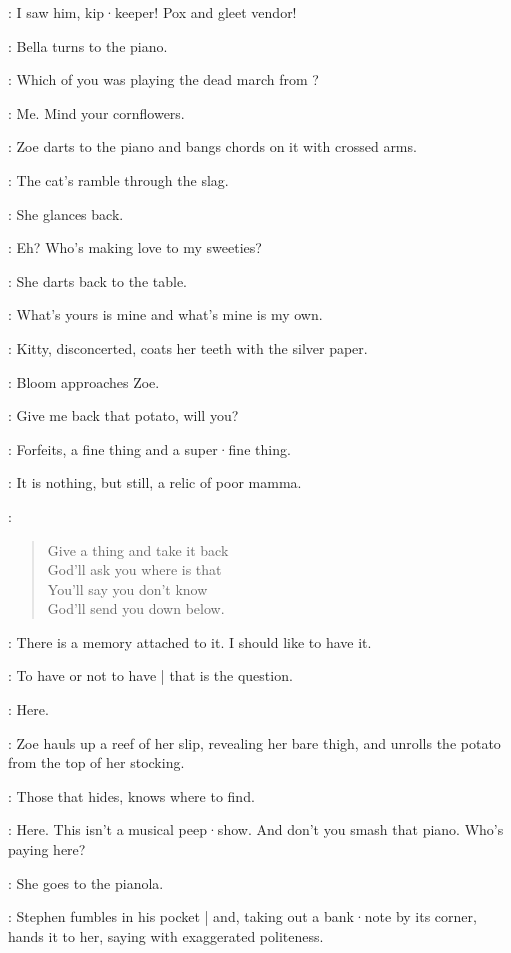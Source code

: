 \Bloom:
I saw him,
kip·keeper!
Pox and gleet vendor!

:
Bella turns to the piano.

\Bella:
Which of you was playing the dead march from ?

\Zoe[1]:
Me.
Mind your cornflowers.

:
Zoe darts to the piano and bangs chords on it with crossed arms.

\Zoe:
The cat's ramble through the slag.

:
She glances back.

\Zoe:
Eh?
Who's making love to my sweeties?

:
She darts back to the table.

\Zoe:
What's yours is mine and what's mine is my own.

:
Kitty,
disconcerted,
coats her teeth with the silver paper.

:
Bloom approaches Zoe.

\Bloom:
Give me back that potato,
will you?

\Zoe:
Forfeits,
a fine thing and a super·fine thing.

\Bloom:
It is nothing,
but still,
a relic of poor mamma.

\Zoe:
\begin{verse}
    Give a thing and take it back\\
    God'll ask you where is that\\
    You'll say you don't know\\
    God'll send you down below.
\end{verse}

\Bloom:
There is a memory attached to it.
%
I should like to have it.

\Stephen[1]:
To have or not to have |
that is the question.

\Zoe:
Here.

:
Zoe hauls up a reef of her slip,
revealing her bare thigh,
and unrolls the potato from the top of her stocking.

\Zoe:
Those that hides,
knows where to find.

\Bella:
Here.
This isn't a musical peep·show.
And don't you smash that piano.
Who's paying here?

:
She goes to the pianola.

:
Stephen fumbles in his pocket |
and,
taking out a bank·note by its corner,
hands it to her,
saying with exaggerated politeness.

